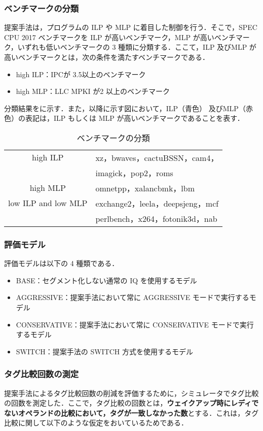 \subsubsection{ベンチマークの分類}
提案手法は，プログラムの ILP や MLP に着目した制御を行う．そこで，SPEC CPU 2017 ベンチマークを ILP が高いベンチマーク，MLP が高いベンチマーク，いずれも低いベンチマークの 3 種類に分類する．ここて，ILP 及びMLP が高いベンチマークとは，次の条件を満たすベンチマークである．
\begin{itemize}
  \item high ILP：IPCが 3.5以上のベンチマーク
  \item high MLP：LLC MPKI が2 以上のベンチマーク
\end{itemize}

分類結果をに示す．また，以降に示す図において，ILP（青色） 及びMLP（赤色）の表記は，ILP もしくは MLP が高いベンチマークであることを表す．
\begin{table}[htb]
  \caption{ベンチマークの分類}
  \footnotesize
  \center
    \begin{tabular}{c|l} \hline \hline
    high ILP & xz，bwaves，cactuBSSN，cam4，\\
             & imagick，pop2，roms\\ \hline
    high MLP &  omnetpp，xalancbmk，lbm\\ \hline
    low ILP and low MLP & exchange2，leela，deepsjeng，mcf\\
                        & perlbench，x264，fotonik3d，nab \\ \hline
  \end{tabular}
  \label{tab:classification}
\end{table}

\subsubsection{評価モデル}
評価モデルは以下の 4 種類である．
\begin{itemize}
  \item BASE：セグメント化しない通常の IQ を使用するモデル
  \item AGGRESSIVE：提案手法において常に AGGRESSIVE モードで実行するモデル
  \item CONSERVATIVE：提案手法において常に CONSERVATIVE モードで実行するモデル
  \item SWITCH：提案手法の SWITCH 方式を使用するモデル 
\end{itemize}

\subsubsection{タグ比較回数の測定}
提案手法によるタグ比較回数の削減を評価するために，シミュレータでタグ比較の回数を測定した．ここで，タグ比較の回数とは，\textbf{ウェイクアップ時にレディでないオペランドの比較において，タグが一致しなかった数}とする．これは，タグ比較に関して以下のような仮定をおいているためである．

